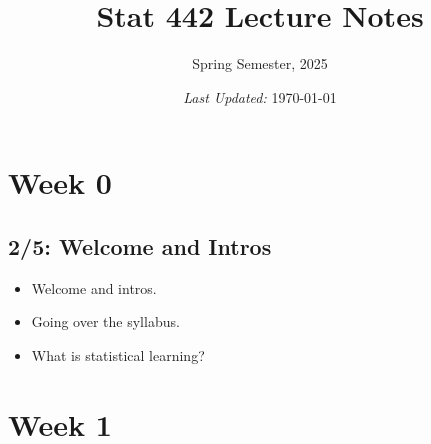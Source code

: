 \documentclass[titlepage,10pt]{scrartcl}
\title{Stat 442 Lecture Notes}
\subtitle{Spring Semester, 2025}
\date{\small\emph{Last Updated:} \today}
\newcommand{\goal}[2]{\item[\IfEqCase{#1}{{0}{{\Large\HollowBox}}{1}{{\Large\CrossedBox}}}] #2}
\newcommand{\logentry}[2]{\paragraph{{#1:}} #2}
\begin{document}
\maketitle

%
%

\hrulefill
\section*{Week 0}

\subsection*{2/5: Welcome and Intros}
\begin{itemize}
\item Welcome and intros.
\item Going over the syllabus. 
\item What is statistical learning? 
\end{itemize}

\section*{Week 1}
\end{document}
